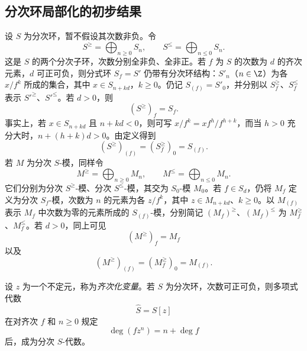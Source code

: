 \subsection{分次环局部化的初步结果}
设 $S$ 为分次环，暂不假设其次数非负。令
\begin{equation}
S^{\geq}=\bigoplus_{n\geq0}S_n,\qquad S^{\leq}=\bigoplus_{n\leq0}S_n.
\tag{8.2.1.1}
\end{equation}
这是 $S$ 的两个分次子环，次数分别全非负、全非正。若 $f$ 为 $S$ 的次数为 $d$ 的齐次元素，$d$ 可正可负，则分式环 $S_f=S'$ 仍带有分次环结构：$S'_n$（$n\in\Z$）为各 $x/f^k$ 所成的集合，其中 $x\in S_{n+kd}$，$k\geq0$。仍记 $S_{(f)}=S'_0$，并分别以 $S_f^{\geq}$、$S_f^{\leq}$ 表示 $S'^{\geq}$、$S'^{\leq}$。若 $d>0$，则
\begin{equation}
(S^{\geq})_f=S_f.
\tag{8.2.1.2}
\end{equation}
事实上，若 $x\in S_{n+kd}$ 且 $n+kd<0$，则可写 $x/f^k=xf^h/f^{h+k}$，而当 $h>0$ 充分大时，$n+(h+k)d>0$。由定义得到
\begin{equation}
(S^{\geq})_{(f)}=(S_f^{\geq})_0=S_{(f)}.
\tag{8.2.1.3}
\end{equation}
若 $M$ 为分次 $S$-模，同样令
\begin{equation}
M^{\geq}=\bigoplus_{n\geq0}M_n,\qquad M^{\leq}=\bigoplus_{n\leq0}M_n.
\tag{8.2.1.4}
\end{equation}
它们分别为分次 $S^{\geq}$-模、分次 $S^{\leq}$-模，其交为 $S_0$-模 $M_0$。若 $f\in S_d$，仍将 $M_f$ 定义为分次 $S_f$-模，次数为 $n$ 的元素为各 $z/f^k$，其中 $z\in M_{n+kd}$、$k\geq0$。以 $M_{(f)}$ 表示 $M_f$ 中次数为零的元素所成的 $S_{(f)}$-模，分别简记 $(M_f)^{\geq}$、$(M_f)^{\leq}$ 为 $M_f^{\geq}$、$M_f^{\leq}$。若 $d>0$，同上可见
\begin{equation}
(M^{\geq})_f=M_f
\tag{8.2.1.5}
\end{equation}
以及
\begin{equation}
(M^{\geq})_{(f)}=(M_f^{\geq})_0=M_{(f)}.
\tag{8.2.1.6}
\end{equation}

设 $z$ 为一个不定元，称为\emph{齐次化变量}。若 $S$ 为分次环，次数可正可负，则多项式代数
\begin{equation}
\widehat S=S[z]
\tag{8.2.2.1}
\end{equation}
在对齐次 $f$ 和 $n\geq0$ 规定
\begin{equation}
\deg(fz^n)=n+\deg f
\tag{8.2.2.2}
\end{equation}
后，成为分次 $S$-代数。

